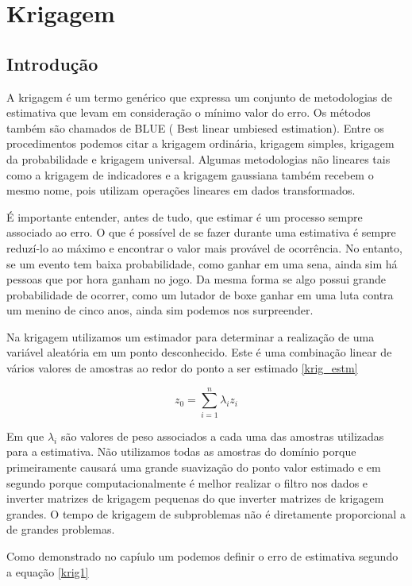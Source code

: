 \chapter{Krigagem}

\section{Introdução} \label{secao1}

A krigagem é um termo genérico que expressa um conjunto de metodologias de estimativa que levam em consideração o mínimo valor do erro. Os métodos também são chamados de BLUE ( Best linear umbiesed estimation). Entre os procedimentos podemos citar a krigagem ordinária, krigagem simples, krigagem da probabilidade e krigagem universal. Algumas metodologias não lineares tais como a krigagem de indicadores e a krigagem gaussiana também recebem o mesmo nome, pois utilizam operações lineares em dados transformados. 

É importante entender, antes de tudo, que estimar é um processo sempre associado ao erro. O que é possível de se fazer durante uma estimativa é sempre reduzí-lo ao máximo e encontrar o valor mais provável de ocorrência. No entanto, se um evento tem baixa probabilidade, como ganhar em uma sena, ainda sim há pessoas que por hora ganham no jogo. Da mesma forma se algo possui grande probabilidade de ocorrer, como um lutador de boxe ganhar em uma luta contra um menino de cinco anos, ainda sim podemos nos surpreender.

Na krigagem utilizamos um estimador para determinar a realização de uma variável aleatória em um ponto desconhecido. Este é uma combinação linear de vários valores de amostras ao redor do ponto a ser estimado \eqref{krig_estm}

\begin{equation}\label{krig_estm}
z_{0} = \sum_{i=1}^{n} \lambda_{i} z_{i} 
\end{equation}

Em que $\lambda_{i}$ são valores de peso associados a cada uma das amostras utilizadas para a estimativa. Não utilizamos todas as amostras do domínio porque primeiramente causará uma grande suavização do ponto valor estimado e em segundo porque computacionalmente é melhor realizar o filtro nos dados e inverter matrizes de krigagem pequenas do que inverter matrizes de krigagem grandes. O tempo de krigagem de subproblemas não é diretamente proporcional a de grandes problemas. 


Como demonstrado no capíulo um podemos definir o erro de estimativa segundo a equação \eqref{krig1}

